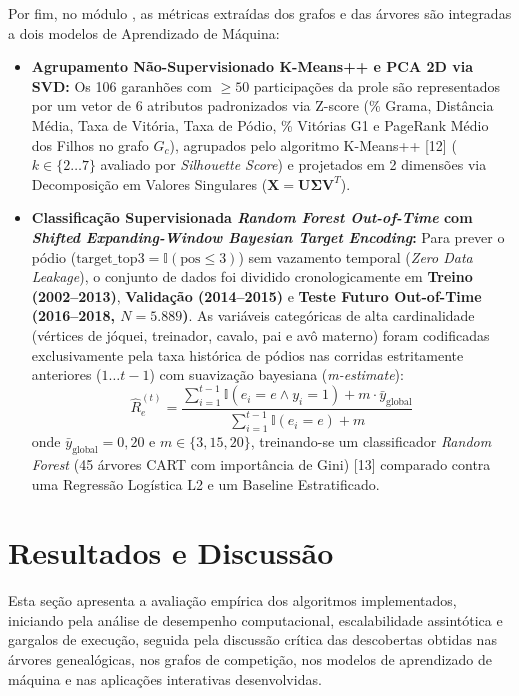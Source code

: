 \documentclass[conference]{IEEEtran}
\begin{document}
Por fim, no módulo , as métricas extraídas dos grafos e das árvores são integradas a dois modelos de Aprendizado de Máquina:
\begin{itemize}
    \item \textbf{Agrupamento Não-Supervisionado K-Means++ e PCA 2D via SVD:} Os 106 garanhões com $\ge 50$ participações da prole são representados por um vetor de 6 atributos padronizados via Z-score (\%
Grama, Distância Média, Taxa de Vitória, Taxa de Pódio, \%
Vitórias G1 e PageRank Médio dos Filhos no grafo $G_c$), agrupados pelo algoritmo K-Means++ [12] ($k \in \{2 \dots 7\}$ avaliado por \textit{Silhouette Score}) e projetados em 2 dimensões via Decomposição em Valores Singulares ($\mathbf{X} = \mathbf{U}\mathbf{\Sigma}\mathbf{V}^T$).
    \item \textbf{Classificação Supervisionada \textit{Random Forest Out-of-Time} com \textit{Shifted Expanding-Window Bayesian Target Encoding}:} Para prever o pódio ($\text{target\_top3} = \mathbb{I}(\text{pos} \le 3)$) sem vazamento temporal (\textit{Zero Data Leakage}), o conjunto de dados foi dividido cronologicamente em \textbf{Treino (2002--2013)}, \textbf{Validação (2014--2015)} e \textbf{Teste Futuro Out-of-Time (2016--2018, $N = 5.889$)}. As variáveis categóricas de alta cardinalidade (vértices de jóquei, treinador, cavalo, pai e avô materno) foram codificadas exclusivamente pela taxa histórica de pódios nas corridas estritamente anteriores ($1 \dots t-1$) com suavização bayesiana (\textit{m-estimate}):
    \begin{equation}
        \hat{R}_{e}^{(t)} = \frac{\sum_{i=1}^{t-1} \mathbb{I}(e_i = e \land y_i = 1) + m \cdot \bar{y}_{\text{global}}}{\sum_{i=1}^{t-1} \mathbb{I}(e_i = e) + m}
    \end{equation}
    onde $\bar{y}_{\text{global}} = 0,20$ e $m \in \{3, 15, 20\}$, treinando-se um classificador \textit{Random Forest} (45 árvores CART com importância de Gini) [13] comparado contra uma Regressão Logística L2 e um Baseline Estratificado.
\end{itemize}

\section{Resultados e Discussão}
Esta seção apresenta a avaliação empírica dos algoritmos implementados, iniciando pela análise de desempenho computacional, escalabilidade assintótica e gargalos de execução, seguida pela discussão crítica das descobertas obtidas nas árvores genealógicas, nos grafos de competição, nos modelos de aprendizado de máquina e nas aplicações interativas desenvolvidas.
\end{document}
